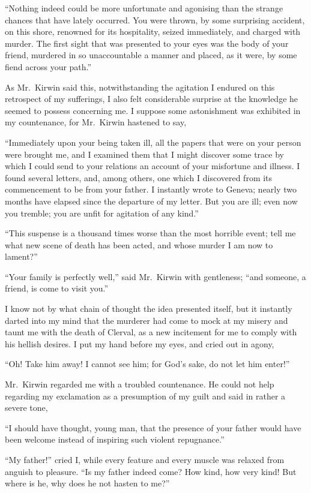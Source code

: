 \documentclass[12pt,openright]{book}
\begin{document}
“Nothing indeed could be more unfortunate and agonising than the strange chances that have lately occurred. You were thrown, by some surprising accident, on this shore, renowned for its hospitality, seized immediately, and charged with murder. The first sight that was presented to your eyes was the body of your friend, murdered in so unaccountable a manner and placed, as it were, by some fiend across your path.”

As Mr. Kirwin said this, notwithstanding the agitation I endured on this retrospect of my sufferings, I also felt considerable surprise at the knowledge he seemed to possess concerning me. I suppose some astonishment was exhibited in my countenance, for Mr. Kirwin hastened to say,

“Immediately upon your being taken ill, all the papers that were on your person were brought me, and I examined them that I might discover some trace by which I could send to your relations an account of your misfortune and illness. I found several letters, and, among others, one which I discovered from its commencement to be from your father. I instantly wrote to Geneva; nearly two months have elapsed since the departure of my letter. But you are ill; even now you tremble; you are unfit for agitation of any kind.”

“This suspense is a thousand times worse than the most horrible event; tell me what new scene of death has been acted, and whose murder I am now to lament?”

“Your family is perfectly well,” said Mr. Kirwin with gentleness; “and someone, a friend, is come to visit you.”

I know not by what chain of thought the idea presented itself, but it instantly darted into my mind that the murderer had come to mock at my misery and taunt me with the death of Clerval, as a new incitement for me to comply with his hellish desires. I put my hand before my eyes, and cried out in agony,

“Oh! Take him away! I cannot see him; for God’s sake, do not let him enter!”

Mr. Kirwin regarded me with a troubled countenance. He could not help regarding my exclamation as a presumption of my guilt and said in rather a severe tone,

“I should have thought, young man, that the presence of your father would have been welcome instead of inspiring such violent repugnance.”

“My father!” cried I, while every feature and every muscle was relaxed from anguish to pleasure. “Is my father indeed come? How kind, how very kind! But where is he, why does he not hasten to me?”
\end{document}
